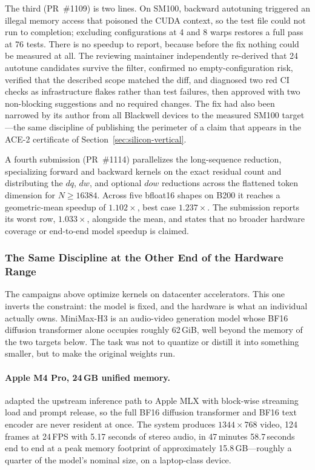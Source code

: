 The third (PR~\#1109) is two lines. On SM100,  backward autotuning triggered an
illegal memory access that poisoned the CUDA context, so the test file could not run
to completion; excluding  configurations at 4 and 8 warps restores a
full pass at 76 tests. There is no speedup to report, because before the fix nothing
could be measured at all. The reviewing maintainer independently re-derived that 24
autotune candidates survive the filter, confirmed no empty-configuration risk,
verified that the described scope matched the diff, and diagnosed two red CI checks
as infrastructure flakes rather than test failures, then approved with two
non-blocking suggestions and no required changes. The fix had also been narrowed by
its author from all Blackwell devices to the measured SM100 target---the same
discipline of publishing the perimeter of a claim that appears in the ACE-2
certificate of Section~\ref{sec:silicon-vertical}.

A fourth submission (PR~\#1114) parallelizes the long-sequence 
reduction, specializing forward and backward kernels on the exact residual count and
distributing the $dq$, $dw$, and optional $dow$ reductions across the flattened token
dimension for $N\geq16384$. Across five bfloat16 shapes on B200 it reaches a
geometric-mean speedup of $1.102\times$, best case $1.237\times$. The submission
reports its worst row, $1.033\times$, alongside the mean, and states that no broader
hardware coverage or end-to-end model speedup is claimed.

\subsubsection{The Same Discipline at the Other End of the Hardware Range}
\label{sec:local-deployment}

The campaigns above optimize kernels on datacenter accelerators. This one inverts
the constraint: the model is fixed, and the hardware is what an individual actually
owns. MiniMax-H3 is an audio-video generation
model whose BF16 diffusion transformer alone occupies roughly 62\,GiB, well beyond
the memory of the two targets below. The task was not to quantize or distill it into
something smaller, but to make the original weights run.

\paragraph{Apple M4 Pro, 24\,GB unified memory.}
\systemname{} adapted the upstream inference path to Apple MLX with block-wise
streaming load and prompt release, so the full BF16 diffusion transformer and BF16
text encoder are never resident at once. The system produces
$1344\times768$ video, 124 frames at 24\,FPS with 5.17 seconds of stereo audio, in
47\,minutes 58.7\,seconds end to end at a peak memory footprint of approximately
15.8\,GB---roughly a quarter of the model's nominal size, on a laptop-class device.

